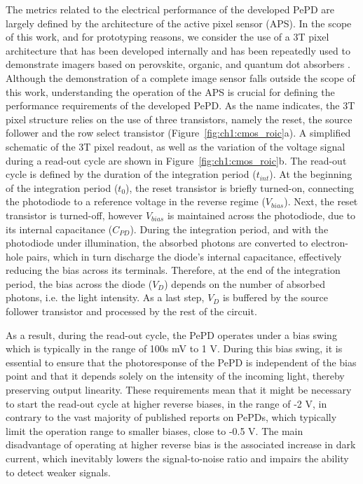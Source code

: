 The metrics related to the electrical performance of the developed PePD are largely defined by the architecture of the active pixel sensor (APS). In the scope of this work, and for prototyping reasons, we consider the use of a 3T pixel architecture that has been developed internally and has been repeatedly used to demonstrate imagers based on perovskite, organic, and quantum dot absorbers \cite{Song2024Lead-FreeSensors, Pejovic2021Thin-FilmImaging, Song2024HalideImager, Siddik2023Interface-EngineeredApplications}. Although the demonstration of a complete image sensor falls outside the scope of this work, understanding the operation of the APS is crucial for defining the performance requirements of the developed PePD. As the name indicates, the 3T pixel structure relies on the use of three transistors, namely the reset, the source follower and the row select transistor (Figure~\ref{fig:ch1:cmos_roic}a). A simplified schematic of the 3T pixel readout, as well as the variation of the voltage signal during a read-out cycle are shown in Figure~\ref{fig:ch1:cmos_roic}b. The read-out cycle is defined by the duration of the integration period ($t_{int}$). At the beginning of the integration period ($t_0$), the reset transistor is briefly turned-on, connecting the photodiode to a reference voltage in the reverse regime ($V_{bias}$). Next, the reset transistor is turned-off, however $V_{bias}$ is maintained across the photodiode, due to its internal capacitance ($C_{PD}$). During the integration period, and with the photodiode under illumination, the absorbed photons are converted to electron-hole pairs, which in turn discharge the diode's internal capacitance, effectively reducing the bias across its terminals. Therefore, at the end of the integration period, the bias across the diode ($V_D$) depends on the number of absorbed photons, i.e. the light intensity. As a last step, $V_D$ is buffered by the source follower transistor and processed by the rest of the circuit. 



As a result, during the read-out cycle, the PePD operates under a bias swing which is typically in the range of 100s mV to 1 V. During this bias swing, it is essential to ensure that the photoresponse of the PePD is independent of the bias point and that it depends solely on the intensity of the incoming light, thereby preserving output linearity. These requirements mean that it might be necessary to start the read-out cycle at higher reverse biases, in the range of -2 V, in contrary to the vast majority of published reports on PePDs, which typically limit the operation range to smaller biases, close to -0.5 V. The main disadvantage of operating at higher reverse bias is the associated increase in dark current, which inevitably lowers the signal-to-noise ratio and impairs the ability to detect weaker signals.


